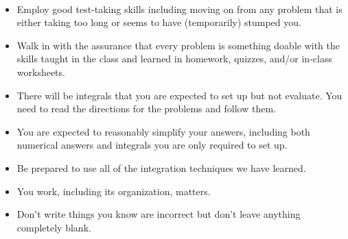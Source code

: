 \documentclass[11pt,fleqn]{article}
\begin{document}
\\

\begin{itemize}
\item Employ good test-taking skills including moving on from any problem that is either taking too long or seems to have (temporarily) stumped you. 
\item Walk in with the assurance that every problem is something doable with the skills taught in the class and learned in homework, quizzes, and/or in-class worksheets.
\item There will be integrals that you are expected to set up but not evaluate. You need to read the directions for the problems and follow them. 
\item You are expected to reasonably simplify your answers, including both numerical answers and integrals you are only required to set up.
\item Be prepared to use all of the integration techniques we have learned.
\item You work, including its organization, matters.
\item Don't write things you know are incorrect but don't leave anything completely blank. 

\end{itemize}
\end{document}
